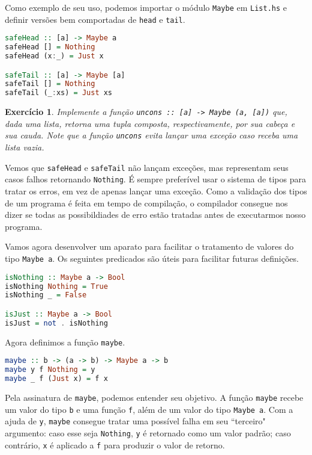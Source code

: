 \documentclass[a4paper]{article}
\newtheorem{exercicio}{Exercício}
\begin{document}
Como exemplo de seu uso, podemos importar o módulo \texttt{Maybe} em \texttt{List.hs} e definir versões bem comportadas de \texttt{head} e \texttt{tail}.

\begin{lstlisting}[language=haskell, frame=single]
safeHead :: [a] -> Maybe a
safeHead [] = Nothing
safeHead (x:_) = Just x

safeTail :: [a] -> Maybe [a]
safeTail [] = Nothing
safeTail (_:xs) = Just xs
\end{lstlisting}

\begin{exercicio}
	Implemente a função \emph{\texttt{uncons :: [a] -> Maybe (a, [a])}} que, dada uma lista, retorna uma tupla composta, respectivamente, por sua cabeça e sua cauda.
	Note que a função \emph{\texttt{uncons}} evita lançar uma exceção caso receba uma lista vazia.
\end{exercicio}

Vemos que \texttt{safeHead} e \texttt{safeTail} não lançam exceções, mas representam seus casos falhos retornando \texttt{Nothing}.
É sempre preferível usar o sistema de tipos para tratar os erros, em vez de apenas lançar uma exceção.
Como a validação dos tipos de um programa é feita em tempo de compilação, o compilador consegue nos dizer se todas as possibildiades de erro estão tratadas antes de executarmos nosso programa.

Vamos agora desenvolver um aparato para facilitar o tratamento de valores do tipo \texttt{Maybe a}.
Os seguintes predicados são úteis para facilitar futuras definições.

\begin{lstlisting}[language=haskell, frame=single]
isNothing :: Maybe a -> Bool
isNothing Nothing = True
isNothing _ = False

isJust :: Maybe a -> Bool
isJust = not . isNothing
\end{lstlisting}

Agora definimos a função \texttt{maybe}.

\begin{lstlisting}[language=haskell, frame=single]
maybe :: b -> (a -> b) -> Maybe a -> b
maybe y f Nothing = y
maybe _ f (Just x) = f x
\end{lstlisting}

Pela assinatura de \texttt{maybe}, podemos entender seu objetivo.
A função \texttt{maybe} recebe um valor do tipo \texttt{b} e uma função \texttt{f}, além de um valor do tipo \texttt{Maybe a}.
Com a ajuda de \texttt{y}, \texttt{maybe} consegue tratar uma possível falha em seu ``terceiro" argumento: caso esse seja \texttt{Nothing}, \texttt{y} é retornado como um valor padrão; caso contrário, \texttt{x} é aplicado a \texttt{f} para produzir o valor de retorno.
\end{document}
